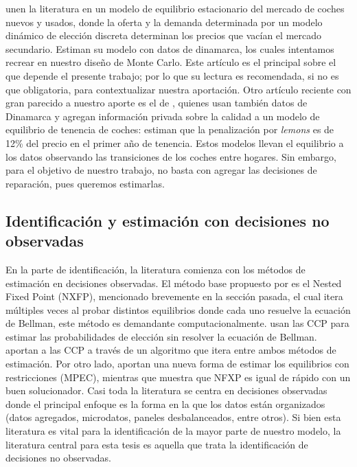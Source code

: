 \documentclass{article}
\begin{document}
\textcite{Gillingham2022} unen la literatura en un modelo de equilibrio estacionario del mercado de coches nuevos y usados, donde la oferta y la demanda determinada por un modelo dinámico de elección discreta determinan los precios que vacían el mercado secundario. Estiman su modelo con datos de dinamarca, los cuales intentamos recrear en nuestro diseño de Monte Carlo. Este artículo es el principal sobre el que depende el presente trabajo; por lo que su lectura es recomendada, si no es que obligatoria, para contextualizar nuestra aportación. Otro artículo reciente con gran parecido a nuestro aporte es el de \textcite{LethPetersenLowMeghir2026}, quienes usan también datos de Dinamarca y agregan información privada sobre la calidad a un modelo de equilibrio de tenencia de coches: estiman que la penalización por \textit{lemons} es de 12\% del precio en el primer año de tenencia. Estos modelos llevan el equilibrio a los datos observando las transiciones de los coches entre hogares. Sin embargo, para el objetivo de nuestro trabajo, no basta con agregar las decisiones de reparación, pues queremos estimarlas.

\subsection{Identificación y estimación con decisiones no observadas}

En la parte de identificación, la literatura comienza con los métodos de estimación en decisiones observadas. El método base propuesto por \textcite{Rust1985} es el Nested Fixed Point (NXFP), mencionado brevemente en la sección pasada, el cual itera múltiples veces al probar distintos equilibrios donde cada uno resuelve la ecuación de Bellman, este método es demandante computacionalmente. \textcite{HotzMiller1993} usan las CCP para estimar las probabilidades de elección sin resolver la ecuación de Bellman. \textcite{AguirregabiriaMira2002} aportan a las CCP a través de un algoritmo que itera entre ambos métodos de estimación. Por otro lado, \textcite{SuJudd2012} aportan una nueva forma de estimar los equilibrios con restricciones (MPEC), mientras que \textcite{Iskhakov2016} muestra que NFXP es igual de rápido con un buen solucionador. Casi toda la literatura se centra en decisiones observadas \parencite{Rust1994,MagnacThesmar2002,ArcidiaconoMiller2020} donde el principal enfoque es la forma en la que los datos están organizados (datos agregados, microdatos, paneles desbalanceados, entre otros). Si bien esta literatura es vital para la identificación de la mayor parte de nuestro modelo, la literatura central para esta tesis es aquella que trata la identificación de decisiones no observadas.
\end{document}

